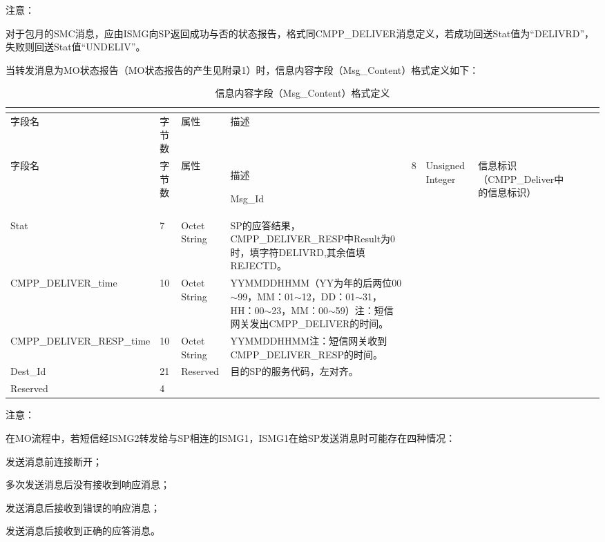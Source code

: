 \documentclass[11pt]{book} %
\begin{document}
注意：


\begin{compactenum}
\item 对于包月的SMC消息，应由ISMG向SP返回成功与否的状态报告，格式同CMPP\_DELIVER消息定义，若成功回送Stat值为“DELIVRD”，失败则回送Stat值“UNDELIV”。
\item 当转发消息为MO状态报告（MO状态报告的产生见附录1）时，信息内容字段（Msg\_Content）格式定义如下：
\end{compactenum}


\begin{longtable}{|m{90pt}|m{35pt}|m{80pt}|m{200pt}|}
\tabularnewline\hline
字段名&字节数&属性&描述
\endhead

\caption{信息内容字段（Msg\_Content）格式定义}\\
\hline
字段名&字节数&属性&描述
\endfirsthead

\endfoot

\endlastfoot

\hline
Msg\_Id&8&Unsigned Integer&信息标识（CMPP\_Deliver中的信息标识）\\
\hline
Stat&7&Octet String&SP的应答结果，CMPP\_DELIVER\_RESP中Result为0时，填字符DELIVRD,其余值填REJECTD。\\
\hline
CMPP\_DELIVER\_time&10&Octet String&YYMMDDHHMM（YY为年的后两位00$\sim$99，MM：01$\sim$12，DD：01$\sim$31，HH：00$\sim$23，MM：00$\sim$59）\newline 注：短信网关发出CMPP\_DELIVER的时间。\\
\hline
CMPP\_DELIVER\_RESP\_time&10&Octet String&YYMMDDHHMM\newline 注：短信网关收到CMPP\_DELIVER\_RESP的时间。\\
\hline
Dest\_Id&21&Reserved&目的SP的服务代码，左对齐。\\
\hline
Reserved&4& & \\
\hline
\end{longtable}


注意：

在MO流程中，若短信经ISMG2转发给与SP相连的ISMG1，ISMG1在给SP发送消息时可能存在四种情况：

\begin{compactenum}
\item 发送消息前连接断开；
\item 多次发送消息后没有接收到响应消息；
\item 发送消息后接收到错误的响应消息；
\item 发送消息后接收到正确的应答消息。
\end{compactenum}
\end{document}
